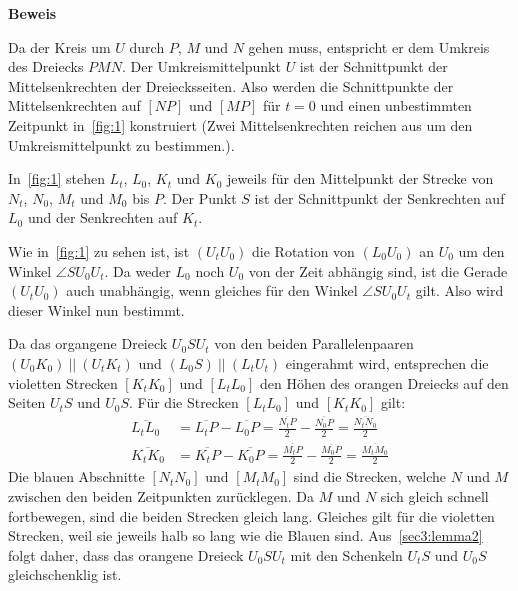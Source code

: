 \documentclass[10pt, a4paper, reqno]{amsart}
\makeatletter
\renewcommand\proofname{Beweis}
\renewenvironment{proof}[1][\proofname]{\par
\pushQED{\qed}%
\normalfont \topsep6\p@\@plus6\p@\relax
\trivlist
\item\relax
{\bfseries#1}\hspace\labelsep\ignorespaces
}{%
\popQED\endtrivlist\@endpefalse
}
\makeatother
\begin{document}
\begin{proof}
\begin{figure}[h]
    \caption{}
    \label{fig:1}
  \end{figure}

  Da der Kreis um $U$ durch $P$, $M$ und $N$ gehen muss, entspricht er dem
  Umkreis des Dreiecks $PMN$. Der Umkreismittelpunkt $U$ ist der Schnittpunkt der Mittelsenkrechten
  der Dreiecksseiten. Also werden die Schnittpunkte der Mittelsenkrechten auf $[NP]$
  und $[MP]$ für $t=0$ und einen unbestimmten Zeitpunkt in~\autoref{fig:1} konstruiert (Zwei
  Mittelsenkrechten reichen aus um den Umkreismittelpunkt zu bestimmen.).
  
  In~\autoref{fig:1} stehen $L_t$, $L_0$, $K_t$ und $K_0$ jeweils für den
  Mittelpunkt der Strecke von $N_t$, $N_0$, $M_t$ und $M_0$ bis $P$. Der Punkt
  $S$ ist der Schnittpunkt der Senkrechten auf $L_0$ und der Senkrechten auf
  $K_t$.

  Wie in~\autoref{fig:1} zu sehen ist, ist $(U_tU_0)$ die Rotation von $(L_0U_0)$ an $U_0$ um den Winkel
  $\angle{}SU_0U_t$. Da weder $L_0$ noch $U_0$ von der Zeit abhängig sind, ist
  die Gerade $(U_tU_0)$ auch unabhängig, wenn gleiches für den Winkel $\angle
  SU_0U_t$ gilt. Also wird dieser Winkel nun bestimmt.
  
  Da das organgene Dreieck $U_0SU_t$ von den beiden Parallelenpaaren
  $(U_0K_0)\ ||\ (U_tK_t)$ und $(L_0S)\ ||\ (L_tU_t)$ eingerahmt wird, entsprechen
  die violetten Strecken $[K_tK_0]$ und $[L_tL_0]$ den Höhen des orangen
  Dreiecks auf den Seiten $U_tS$ und $U_0S$. Für die Strecken $[L_tL_0]$ und $[K_tK_0]$ gilt:
  \begin{align*}
    \overline{L_tL_0}&=\overline{L_tP}-\overline{L_0P}=\frac{\overline{N_tP}}{2} - \frac{\overline{N_0P}}{2} = \frac{\overline{N_tN_0}}{2}\\
    \overline{K_tK_0}&=\overline{K_tP}-\overline{K_0P}=\frac{\overline{M_tP}}{2} - \frac{\overline{M_0P}}{2} = \frac{\overline{M_tM_0}}{2}
  \end{align*}
  Die blauen Abschnitte $[N_tN_0]$ und $[M_tM_0]$ sind die Strecken, welche $N$ und $M$ zwischen den
  beiden Zeitpunkten zurücklegen. Da $M$ und $N$ sich gleich
  schnell fortbewegen, sind die beiden Strecken gleich lang. Gleiches gilt für
  die violetten Strecken, weil sie jeweils halb so lang wie die Blauen sind.
  Aus~\autoref{sec3:lemma2} folgt daher, dass das orangene Dreieck $U_0SU_t$ mit
  den Schenkeln $U_tS$ und $U_0S$ gleichschenklig ist.


\end{proof}
\end{document}
